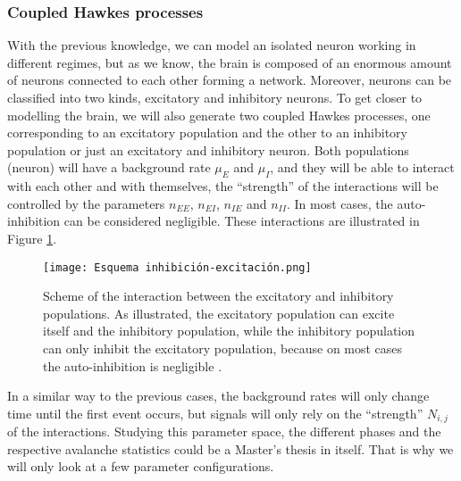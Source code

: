 \subsubsection{Coupled Hawkes processes} \label{subsubsec:Coupled_Hawkes_processes}
With the previous knowledge, we can model an isolated neuron working in different regimes, but as we know, the brain is composed of an enormous amount of neurons connected to each 
other forming a network. Moreover, neurons can be classified into two kinds, excitatory and inhibitory neurons. To get closer to modelling the brain, we will also generate two coupled
Hawkes processes, one corresponding to an excitatory population and the other to an inhibitory population or just an excitatory and inhibitory neuron. 
Both populations (neuron) will have a background rate $\mu_E$ and $\mu_I$, and they will be able to interact with each other and with themselves, the ``strength'' of the interactions 
will be controlled by the parameters $n_{EE}$, $n_{EI}$, $n_{IE}$ and $n_{II}$. In most cases, the auto-inhibition can be considered negligible. 
These interactions are illustrated in Figure \ref{f: Hawkes coupled}.  

\begin{figure}[H]
\centering
\texttt{[image: Esquema inhibición-excitación.png]}
\caption{Scheme of the interaction between the excitatory and inhibitory populations. As illustrated, the excitatory population can excite itself and the inhibitory population, while the
inhibitory population can only inhibit the excitatory population, because on most cases the auto-inhibition is negligible \cite{kalle2018growing}.}
\label{f: Hawkes coupled}
\end{figure}

In a similar way to the previous cases, the background rates will only change time until the first event occurs, but signals will only rely on the ``strength'' $N_{i,j}$ of the interactions.
Studying this parameter space, the different phases and the respective avalanche statistics could be a Master's thesis in itself. That is why we will only look at a few parameter 
configurations.

